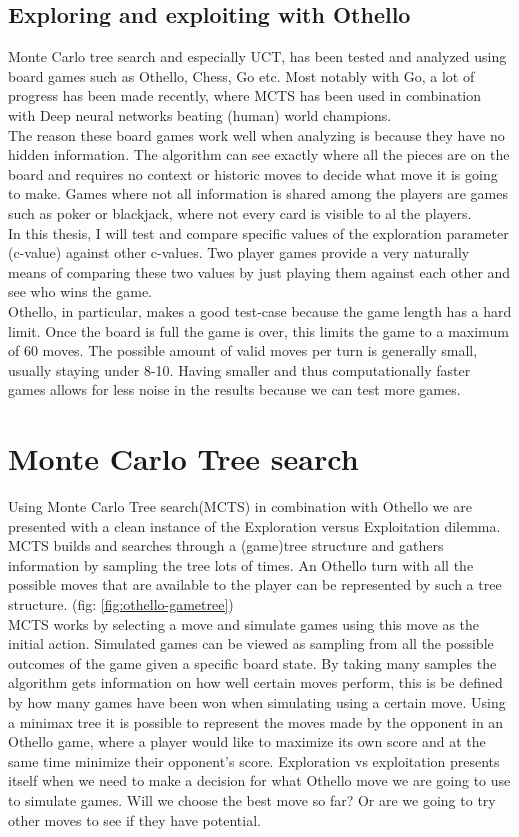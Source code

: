 \documentclass[
11pt, %
english, %
singlespacing, %
headsepline, %
]{MastersDoctoralThesis} %
\begin{document}
\subsection{Exploring and exploiting with Othello}
Monte Carlo tree search and especially UCT, has been tested and analyzed using board games such as Othello, Chess, Go etc. Most notably with Go, a lot of progress has been made recently, where MCTS has been used in combination with Deep neural networks beating (human) world champions\cite{deepmind}.\\
The reason these board games work well when analyzing is because they have no hidden information. The algorithm can see exactly where all the pieces are on the board and requires no context or historic moves to decide what move it is going to make. Games where not all information is shared among the players are games such as poker or blackjack, where not every card is visible to al the players.\\

In this thesis, I will test and compare specific values of the exploration parameter (c-value) against other c-values. Two player games provide a very naturally means of comparing these two values by just playing them against each other and see who wins the game.\\
Othello, in particular, makes a good test-case because the game length has a hard limit. Once the board is full the game is over, this limits the game to a maximum of 60 moves. The possible amount of valid moves per turn is generally small, usually staying under 8-10. Having smaller and thus computationally faster games allows for less noise in the results because we can test more games.

\section{Monte Carlo Tree search}
Using Monte Carlo Tree search(MCTS) in combination with Othello we are presented with a clean instance of the Exploration versus Exploitation dilemma. MCTS builds and searches through a (game)tree structure and gathers information by sampling the tree lots of times. An Othello turn with all the possible moves that are available to the player can be represented by such a tree structure. (fig: \ref{fig:othello-gametree})\\ 

MCTS works by selecting a move and simulate games using this move as the initial action. Simulated games can be viewed as sampling from all the possible outcomes of the game given a specific board state. By taking many samples the algorithm gets information on how well certain moves perform, this is be defined by how many games have been won when simulating using a certain move. Using a minimax tree it is possible to represent the moves made by the opponent in an Othello game, where a player would like to maximize its own score and at the same time minimize their opponent's score. 
Exploration vs exploitation presents itself when we need to make a decision for what Othello move we are going to use to simulate games. Will we choose the best move so far? Or are we going to try other moves to see if they have potential.
\end{document}
